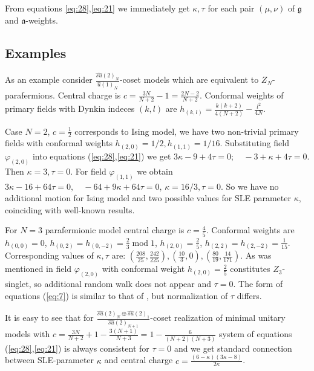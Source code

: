 \documentclass{jetpl}
\newcommand{\gf}{\mathfrak{g}}
\newcommand{\af}{\mathfrak{a}}
\begin{document}
From equations \eqref{eq:28},\eqref{eq:21} we immediately get $\kappa,\tau$ for each pair $(\mu,\nu)$ of $\gf$ and $\af$-weights. 

\subsection{Examples}
\label{sec:examples-1}
As an example consider  $\frac{\hat{su}(2)_{N}}{\hat{u}(1)_{N}}$-coset models which are equivalent to $Z_{N}$-parafermions.  Central charge is $c=\frac{3N}{N+2}-1=\frac{2N-2}{N+2}$. Conformal weights of primary fields with Dynkin indeces $(k,l)$ are $h_{(k,l)}=\frac{k(k+2)}{4(N+2)}-\frac{l^{2}}{4N}$.

Case $N=2$, $c=\frac{1}{2}$ corresponds to Ising model, we have two non-trivial primary fields with conformal weights $h_{(2,0)}=1/2, h_{(1,1)}=1/16$. Substituting field $\varphi_{(2,0)}$ into equations (\ref{eq:28},\ref{eq:21}) we get $3\kappa-9+4\tau =0;\quad -3+\kappa+4\tau=0$. Then $\kappa=3, \tau=0$. For field $\varphi_{(1,1)}$ we obtain $3\kappa-16+64\tau=0,\quad -64+9\kappa + 64\tau=0$, $\kappa=16/3, \tau=0$. So we have no additional motion for Ising model and two possible values for SLE parameter $\kappa$,  coinciding with well-known results. 

For $N=3$ parafermionic model central charge is $c=\frac{4}{5}$. Conformal weights are $h_{(0,0)}=0$, $h_{(0,2)}=h_{(0,-2)}=\frac{2}{3}\; \mathrm{mod}\; 1$, $h_{(2,0)}=\frac{2}{5}$, $h_{(2,2)}=h_{(2,-2)}=\frac{1}{15}$.  Corresponding values of $\kappa,\tau$ are: $(\frac{208}{25},\frac{242}{225}), (\frac{10}{3},0),(\frac{80}{19},\frac{14}{171})$. As was mentioned in \cite{santachiara2008sle} field $\varphi_{(2,0)}$ with conformal weight $h_{(2,0)}=\frac{2}{5}$ constitutes $Z_{3}$-singlet, so  additional random walk does not appear and $\tau=0$. The form of equations (\ref{eq:7}) is similar to that of \cite{santachiara2008sle}, but normalization of $\tau$ differs. 

It is easy to see that for  $\frac{\hat{su}(2)_{N}\oplus \hat{su}(2)_{1}}{\hat{su}(2)_{N+1}}$-coset realization of minimal unitary models with $c=\frac{3N}{N+2}+1-\frac{3(N+1)}{N+3}=1-\frac{6}{(N+2)(N+3)}$ system of equations (\ref{eq:28},\ref{eq:21}) is always consistent for $\tau=0$ and we get standard connection between SLE-parameter $\kappa$ and central charge $c=\frac{(6-\kappa)(3\kappa-8)}{2\kappa}$. 
\end{document}
